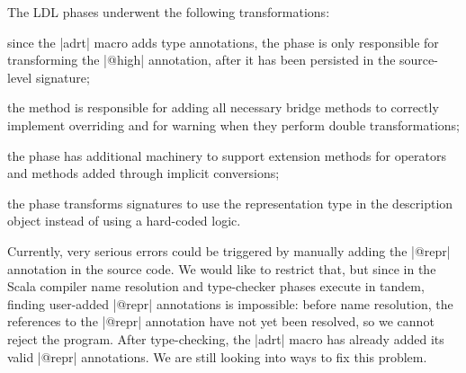 The LDL phases underwent the following transformations:
\begin{compactitem}
\item since the |adrt| macro adds type annotations, the \inject{} phase is only responsible for transforming the |@high| annotation, after it has been persisted in the source-level signature;
\item the \bridge{} method is responsible for adding all necessary bridge methods to correctly implement overriding and for warning when they perform double transformations;
\item the \coerce{} phase has additional machinery to support extension methods for operators and methods added through implicit conversions;
\item the \commit{} phase transforms signatures to use the representation type in the description object instead of using a hard-coded logic.
\end{compactitem}

Currently, very serious errors could be triggered by manually adding the |@repr| annotation in the source code. We would like to restrict that, but since in the Scala compiler name resolution and type-checker phases execute in tandem, finding user-added |@repr| annotations is impossible: before name resolution, the references to the |@repr| annotation have not yet been resolved, so we cannot reject the program. After type-checking, the |adrt| macro has already added its valid |@repr| annotations. We are still looking into  ways to fix this problem.
